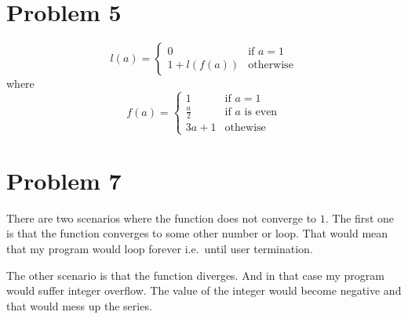 \documentclass{article}
\begin{document}
\section{Problem 5}
$$
    l(a) =
    \begin{cases}
        0           & \text{if } a = 1 \\
        1 + l(f(a)) & \text{otherwise}
    \end{cases}
$$
where
$$
    f(a) =
    \begin{cases}
        1         & \text{if } a = 1 \\
        \frac a 2 & \text{if } a \text{ is even} \\
        3a + 1    & \text{othewise}
    \end{cases}
$$

\section{Problem 7}
There are two scenarios where the function does not converge to $1$. The first
one is that the function converges to some other number or loop. That would mean
that my program would loop forever i.e.\ until user termination.

The other scenario is that the function diverges. And in that case my program
would suffer integer overflow. The value of the integer would become negative
and that would mess up the series.
\end{document}

